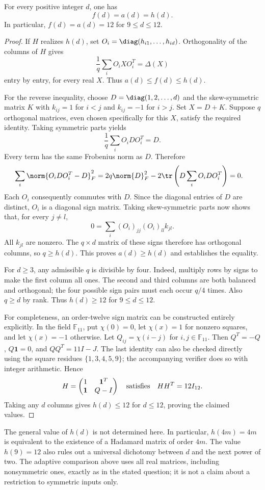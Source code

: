 \begin{theorem}\label{thm:mi08}
For every positive integer $d$, one has
\[
 f(d)=a(d)=h(d).
\]
In particular, $f(d)=a(d)=12$ for $9\leq d\leq12$.
\end{theorem}
\begin{proof}
If $H$ realizes $h(d)$, set $O_i=\diag(h_{i1},\ldots,h_{id})$. Orthogonality of the columns of $H$ gives
\[
 \frac1q\sum_iO_iXO_i^T=\Delta(X)
\]
entry by entry, for every real $X$. Thus $a(d)\leq f(d)\leq h(d)$.

For the reverse inequality, choose $D=\diag(1,2,\ldots,d)$ and the skew-symmetric matrix $K$ with $k_{ij}=1$ for $i<j$ and $k_{ij}=-1$ for $i>j$. Set $X=D+K$. Suppose $q$ orthogonal matrices, even chosen specifically for this $X$, satisfy the required identity. Taking symmetric parts yields
\[
 \frac1q\sum_iO_iDO_i^T=D.
\]
Every term has the same Frobenius norm as $D$. Therefore
\begin{align*}
 \sum_i\norm{O_iDO_i^T-D}_F^2
 &=2q\norm{D}_F^2-2\tr\left(D\sum_iO_iDO_i^T\right)=0.
\end{align*}
Each $O_i$ consequently commutes with $D$. Since the diagonal entries of $D$ are distinct, $O_i$ is a diagonal sign matrix. Taking skew-symmetric parts now shows that, for every $j\ne l$,
\[
 0=\sum_i (O_i)_{jj}(O_i)_{ll}k_{jl}.
\]
All $k_{jl}$ are nonzero. The $q\times d$ matrix of these signs therefore has orthogonal columns, so $q\geq h(d)$. This proves $a(d)\geq h(d)$ and establishes the equality.

For $d\geq3$, any admissible $q$ is divisible by four. Indeed, multiply rows by signs to make the first column all ones. The second and third columns are both balanced and orthogonal; the four possible sign pairs must each occur $q/4$ times. Also $q\geq d$ by rank. Thus $h(d)\geq12$ for $9\leq d\leq12$.

For completeness, an order-twelve sign matrix can be constructed entirely explicitly. In the field $\mathbb F_{11}$, put $\chi(0)=0$, let $\chi(x)=1$ for nonzero squares, and let $\chi(x)=-1$ otherwise. Let $Q_{ij}=\chi(i-j)$ for $i,j\in\mathbb F_{11}$. Then $Q^T=-Q$, $Q\mathbf1=0$, and $QQ^T=11I-J$. The last identity can also be checked directly using the square residues $\{1,3,4,5,9\}$; the accompanying verifier does so with integer arithmetic. Hence
\[
 H=\begin{pmatrix}1&\mathbf1^T\\\mathbf1&Q-I\end{pmatrix}
 \quad\hbox{satisfies}\quad HH^T=12I_{12}.
\]
Taking any $d$ columns gives $h(d)\leq12$ for $d\leq12$, proving the claimed values.
\end{proof}

\begin{remark}
The general value of $h(d)$ is not determined here. In particular, $h(4m)=4m$ is equivalent to the existence of a Hadamard matrix of order $4m$. The value $h(9)=12$ also rules out a universal dichotomy between $d$ and the next power of two. The adaptive comparison above uses all real matrices, including nonsymmetric ones, exactly as in the stated question; it is not a claim about a restriction to symmetric inputs only.
\end{remark}

